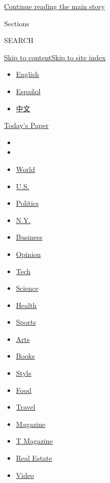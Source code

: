 \protect\hyperlink{after-dfp-ad-top}{Continue reading the main story}

Sections

SEARCH

\protect\hyperlink{site-content}{Skip to
content}\protect\hyperlink{site-index}{Skip to site index}

\begin{itemize}
\tightlist
\item
  \href{/}{English}
\item
  \href{https://www.nytimes.com/es/}{Español}
\item
  \href{https://cn.nytimes.com}{中文}
\end{itemize}

\href{https://myaccount.nytimes.com/auth/login?response_type=cookie\&client_id=vi}{}

\href{https://www.nytimes.com/section/todayspaper}{Today's Paper}

\begin{itemize}
\item
\item
\item
  \href{https://www.nytimes.com/section/world}{World}
\item
  \href{https://www.nytimes.com/section/us}{U.S.}
\item
  \href{https://www.nytimes.com/section/politics}{Politics}
\item
  \href{https://www.nytimes.com/section/nyregion}{N.Y.}
\item
  \href{https://www.nytimes.com/section/business}{Business}
\item
  \href{https://www.nytimes.com/section/opinion}{Opinion}
\item
  \href{https://www.nytimes.com/section/technology}{Tech}
\item
  \href{https://www.nytimes.com/section/science}{Science}
\item
  \href{https://www.nytimes.com/section/health}{Health}
\item
  \href{https://www.nytimes.com/section/sports}{Sports}
\item
  \href{https://www.nytimes.com/section/arts}{Arts}
\item
  \href{https://www.nytimes.com/section/books}{Books}
\item
  \href{https://www.nytimes.com/section/style}{Style}
\item
  \href{https://www.nytimes.com/section/food}{Food}
\item
  \href{https://www.nytimes.com/section/travel}{Travel}
\item
  \href{https://www.nytimes.com/section/magazine}{Magazine}
\item
  \href{https://www.nytimes.com/section/t-magazine}{T Magazine}
\item
  \href{https://www.nytimes.com/section/realestate}{Real Estate}
\item
  \href{https://www.nytimes.com/video}{Video}
\end{itemize}

